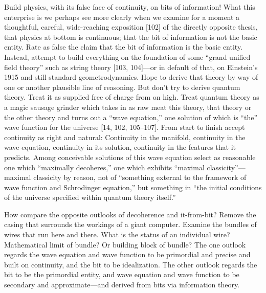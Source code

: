 \documentclass[11pt]{article}
\begin{document}
	Build physics, with its false face of continuity, on bits of information! What
	this enterprise is we perhaps see more clearly when we examine for a moment a
	thoughtful, careful, wide-reaching exposition [102] of the directly opposite thesis,
	that physics at bottom is continuous; that the bit of information is not the basic entity. Rate as false the claim that the bit of information is the basic entity. Instead,
	attempt to build everything on the foundation of some ``grand unified field theory''
	such as string theory [103, 104]---or in default of that, on Einstein's 1915 and still
	standard geometrodynamics. Hope to derive that theory by way of one or another
	plausible line of reasoning. But don't try to derive quantum theory. Treat it as
	supplied free of charge from on high. Treat quantum theory as a magic sausage
	grinder which takes in as raw meat this theory, that theory or the other theory
	and turns out a ``wave equation,'' one solution of which is ``the'' wave function for
	the universe [14, 102, 105--107]. From start to finish accept continuity as right and
	natural: Continuity in the manifold, continuity in the wave equation, continuity in
	its solution, continuity in the features that it predicts. Among conceivable solutions
	of this wave equation select as reasonable one which ``maximally decoheres,'' one
	which exhibits ``maximal classicity''---maximal classicity by reason, not of ``something external to the framework of wave function and Schrodinger equation,'' but
	something in ``the initial conditions of the universe specified within quantum theory
	itself.''
	
	How compare the opposite outlooks of decoherence and it-from-bit? Remove
	the casing that surrounds the workings of a giant computer. Examine the bundles
	of wires that run here and there. What is the status of an individual wire? Mathematical limit of bundle? Or building block of bundle? The one outlook regards
	the wave equation and wave function to be primordial and precise and built on
	continuity, and the bit to be idealization. The other outlook regards the bit to be
	the primordial entity, and wave equation and wave function to be secondary and
	approximate---and derived from bits via information theory.
	
\end{document}
